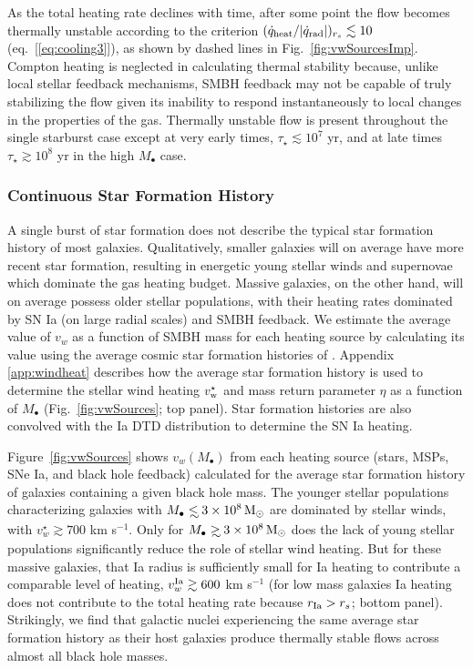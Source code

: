 \documentclass[usenatbib,fleqn]{mn2e}
\newcommand\lsim{\mathrel{\rlap{\lower4pt\hbox{\hskip1pt$\sim$}}
    \raise1pt\hbox{$<$}}}
\newcommand\gsim{\mathrel{\rlap{\lower4pt\hbox{\hskip1pt$\sim$}}
    \raise1pt\hbox{$>$}}}
\newcommand{\rs}{r_s}
\newcommand{\Mbh}[1][]{M_{\bullet#1}}
\newcommand{\vwO}{v_{w}}
\begin{document}
As the total heating rate declines with time, after some point the
flow becomes thermally unstable according to the criterion
$(\dot{q}_{\rm heat}/|\dot{q}_{\rm rad}|)_{r_{s}} \lesssim 10$
(eq.~[\ref{eq:cooling3}]), as shown by dashed lines in
Fig.~\ref{fig:vwSourcesImp}.  Compton heating is neglected in
calculating thermal stability because, unlike local stellar feedback
mechanisms, SMBH feedback may not be capable of truly stabilizing the
flow given its inability to respond instantaneously to local changes
in the properties of the gas.  Thermally unstable flow is present
throughout the single starburst case except at very early times,
$\tau_{\star} \lesssim 10^7$ yr, and at late times $\tau_{\star}
\gtrsim 10^{8}$ yr in the high $M_{\bullet}$ case.

\subsubsection{Continuous Star Formation History}
A single burst of star formation does not describe the typical star
formation history of most galaxies.  Qualitatively, smaller galaxies
will on average have more recent star formation, resulting in
energetic young stellar winds and supernovae which dominate the gas
heating budget.  Massive galaxies, on the other hand, will on average
possess older stellar populations, with their heating rates dominated
by SN Ia (on large radial scales) and SMBH feedback.  We estimate the
average value of $\vwO$ as a function of SMBH mass for each heating
source by calculating its value using the average cosmic star
formation histories of \citet{MosterNaab+:2013a}.  Appendix
\ref{app:windheat} describes how the average star formation history is
used to determine the stellar wind heating $v_{\rm w}^{\star}$ and
mass return parameter $\eta$ as a function of $M_{\bullet}$
(Fig.~\ref{fig:vwSources}; top panel).  Star formation histories are also
convolved with the Ia DTD distribution to determine the SN Ia heating.

Figure~\ref{fig:vwSources} shows $\vwO(M_{\bullet})$ from each heating
source (stars, MSPs, SNe Ia, and black hole feedback) calculated for
the average star formation history of galaxies containing a given
black hole mass.  The younger stellar populations characterizing galaxies
with $\Mbh\lsim 3\times 10^{8} \Msun$ are dominated by stellar winds, with $v_{w}^{\star} \gtrsim 700$ km s$^{-1}$.  Only for $\Mbh\gsim 3\times 10^{8} \Msun$ does the lack
of young stellar populations significantly reduce the role of stellar
wind heating.  But for these massive galaxies, that Ia radius is sufficiently small for Ia heating to contribute a comparable level of heating, $v_{w}^{\rm Ia} \gtrsim 600$ km s$^{-1}$ (for low mass galaxies Ia heating does not contribute to the total heating rate because $r_{\rm Ia} > \rs$; bottom panel).  Strikingly, we find that galactic nuclei experiencing the same
  average star formation history as their host galaxies produce thermally stable flows across almost all black hole masses.  
\end{document}
